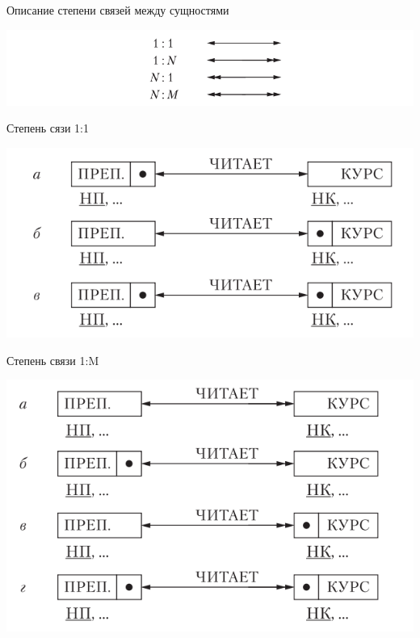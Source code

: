 \documentclass{beamer}
\begin{document}
\begin{frame}{Описание степени связей между сущностями}
\begin{center}
\includegraphics[scale=0.6]{images/lec03-pic04.png}
\end{center}
\end{frame}

\begin{frame}{Степень сязи 1:1}
\begin{center}
\includegraphics[scale=0.6]{images/lec03-pic05.png}
\end{center}
\end{frame}

\begin{frame}{Степень связи 1:M}
\begin{center}
\includegraphics[scale=0.6]{images/lec03-pic06.png}
\end{center}
\end{frame}
\end{document}
